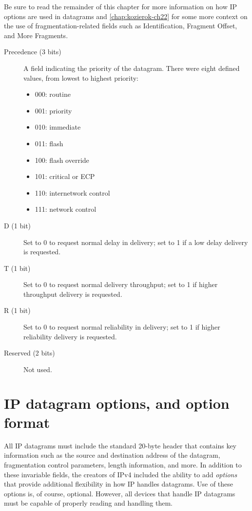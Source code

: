 \begin{note}
Be sure to read the remainder of this chapter for more information on how IP options are used in datagrams and \cref{chap:kozierok-ch22} for some more
context on the use of fragmentation-related fields such as Identification, Fragment Offset, and More Fragments.
\end{note}


\begin{description}
   \item[Precedence (3 bits)]
      A field indicating the priority of the datagram.
      There were eight defined values, from lowest to highest priority:
      \begin{itemize}
         \item 000: routine
         \item 001: priority
         \item 010: immediate
         \item 011: flash
         \item 100: flash override
         \item 101: critical or ECP
         \item 110: internetwork control
         \item 111: network control
      \end{itemize}
   \item[D (1 bit)]
      Set to 0 to request normal delay in delivery; set to 1 if a low delay delivery is requested.
   \item[T (1 bit)]
      Set to 0 to request normal delivery throughput; set to 1 if higher throughput delivery is requested.
   \item[R (1 bit)]
      Set to 0 to request normal reliability in delivery; set to 1 if higher reliability delivery is requested.
   \item[Reserved (2 bits)]
      Not used.
\end{description}



\section{IP datagram options, and option format}
\label{sec:ip-datagram-options}


All IP datagrams must include the standard 20-byte header that contains key
information such as the source and destination address of the datagram,
fragmentation control parameters, length information, and more. In
addition to these invariable fields, the creators of IPv4 included the
ability to add \emph{options} that provide additional flexibility in
how IP handles datagrams. Use of these options is, of course, optional.
However, all devices that handle IP datagrams must be capable of
properly reading and handling them.

